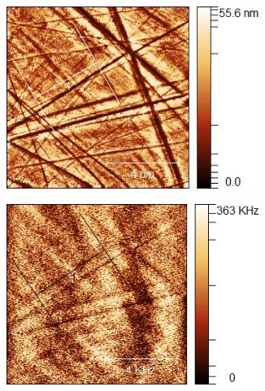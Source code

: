 \begin{figure}[h!]
    \centering
    \begin{subfigure}[b]{0.45\textwidth}
        \centering
        \includegraphics[width = 0.9\textwidth]{figures/chap4/CdTe_Ag_10um_256px_med1-Height_R.jpg}
    \end{subfigure}\hfill
    \begin{subfigure}[b]{0.45\textwidth}
        \centering
        \includegraphics[width = 0.9\textwidth]{figures/chap4/CdTe_Ag_10um_256px_med1-NSOM_R}
    \end{subfigure}


\end{figure}

